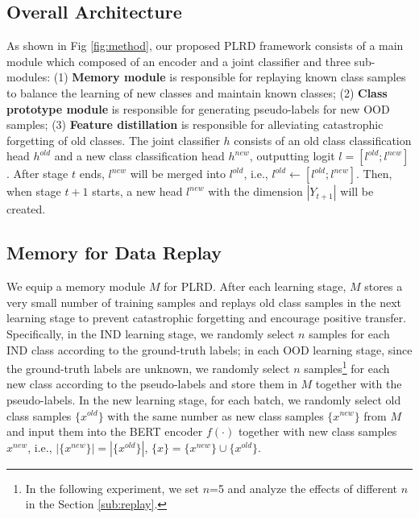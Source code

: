 \documentclass[11pt]{article}
\begin{document}
\subsection{Overall Architecture}
As shown in Fig \ref{fig:method}, our proposed PLRD framework consists of a main module which composed of an encoder and a joint classifier and three sub-modules: (1) \textbf{Memory module} is responsible for replaying known class samples to balance the learning of new classes and maintain known classes; (2) \textbf{Class prototype module} is responsible for generating pseudo-labels for new OOD samples; (3) \textbf{Feature distillation} is responsible for alleviating catastrophic forgetting of old classes. The joint classifier $h$ consists of an old class classification head $h^{old}$ and a new class classification head $h^{new}$, outputting logit $l=[l^{old};l^{new}]$. After stage $t$ ends, $l^{new}$ will be merged into $l^{old}$, i.e., $l^{old}\leftarrow [l^{old};l^{new}]$. Then, when stage $t+1$ starts, a new head  $l^{new}$ with the dimension $|Y_{t+1}|$ will be created.


\subsection{Memory for Data Replay}
We equip a memory module $M$ for PLRD. After each learning stage, $M$ stores a very small number of training samples and replays old class samples in the next learning stage to prevent catastrophic forgetting and encourage positive transfer. Specifically, in the IND learning stage, we randomly select $n$ samples for each IND class according to the ground-truth labels; in each OOD learning stage, since the ground-truth labels are unknown, we randomly select $n$ samples\footnote{In the following experiment, we set $n$=5 and analyze the effects of different $n$ in the Section \ref{sub:replay}.} for each new class according to the pseudo-labels and store them in $M$ together with the pseudo-labels. In the new learning stage, for each batch, we randomly select old class samples $\{x^{old}\}$ with the same number as new class samples $\{x^{new}\}$ from $M$ and input them into the BERT encoder $f(\cdot)$ together with new class samples $x^{new}$, i.e., $|\{x^{new}\}|=|\{x^{old}\}|$, $\{x\}=\{x^{new}\}\cup \{x^{old}\}$.
\end{document}
